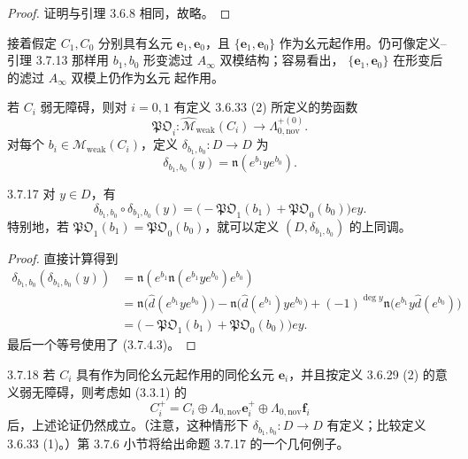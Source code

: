 \begin{proof}
证明与引理 3.6.8 相同，故略。
\end{proof}

接着假定 $C_1,C_0$ 分别具有幺元 $\mathbf e_1,\mathbf e_0$，且
$\{\mathbf e_1,\mathbf e_0\}$ 作为幺元起作用。仍可像定义--引理 3.7.13
那样用 $b_1,b_0$ 形变滤过 $A_\infty$ 双模结构；容易看出，
$\{\mathbf e_1,\mathbf e_0\}$ 在形变后的滤过 $A_\infty$ 双模上仍作为幺元
起作用。

若 $C_i$ 弱无障碍，则对 $i=0,1$ 有定义 3.6.33 (2) 所定义的势函数
\begin{equation}
  \mathfrak{PO}_i\colon
  \widehat{\mathcal M}_{\mathrm{weak}}(C_i)
  \longrightarrow\Lambda_{0,\mathrm{nov}}^{+(0)}.
\tag{3.7.15}\label{eq:3-7-15}
\end{equation}
对每个 $b_i\in\widehat{\mathcal M}_{\mathrm{weak}}(C_i)$，定义
$\delta_{b_1,b_0}\colon D\to D$ 为
\begin{equation}
  \delta_{b_1,b_0}(y)=\mathfrak n(e^{b_1}ye^{b_0}).
\tag{3.7.16}\label{eq:3-7-16}
\end{equation}

\begin{proposition}{3.7.17}\label{prop:3-7-17}
对 $y\in D$，有
\[
  \delta_{b_1,b_0}\circ\delta_{b_1,b_0}(y)
  =\bigl(-\mathfrak{PO}_1(b_1)+\mathfrak{PO}_0(b_0)\bigr)ey.
\]
特别地，若
$\mathfrak{PO}_1(b_1)=\mathfrak{PO}_0(b_0)$，就可以定义
$(D,\delta_{b_1,b_0})$ 的上同调。
\end{proposition}

\begin{proof}
直接计算得到
\[
\begin{aligned}
\delta_{b_1,b_0}(\delta_{b_1,b_0}(y))
&=\mathfrak n(e^{b_1}\mathfrak n(e^{b_1}ye^{b_0})e^{b_0})\\
&=\mathfrak n\bigl(\widehat d(e^{b_1}ye^{b_0})\bigr)
  -\mathfrak n\bigl(\widehat d(e^{b_1})ye^{b_0}\bigr)
  +(-1)^{\deg y}\mathfrak n\bigl(e^{b_1}y\widehat d(e^{b_0})\bigr)\\
&=\bigl(-\mathfrak{PO}_1(b_1)+\mathfrak{PO}_0(b_0)\bigr)ey.
\end{aligned}
\]
最后一个等号使用了 (3.7.4.3)。
\end{proof}

\begin{remark}{3.7.18}\label{rem:3-7-18}
若 $C_i$ 具有作为同伦幺元起作用的同伦幺元 $\mathbf e_i$，并且按定义
3.6.29 (2) 的意义弱无障碍，则考虑如 (3.3.1) 的
\[
  C_i^+=C_i\oplus\Lambda_{0,\mathrm{nov}}\mathbf e_i^+
  \oplus\Lambda_{0,\mathrm{nov}}\mathbf f_i
\]
后，上述论证仍然成立。（注意，这种情形下
$\delta_{b_1,b_0}\colon D\to D$ 有定义；比较定义 3.6.33 (1)。）第
3.7.6 小节将给出命题 3.7.17 的一个几何例子。
\end{remark}
